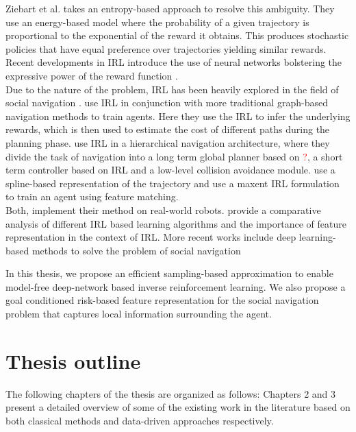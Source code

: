 Ziebart et al. \cite{ziebart_maxent_2008} takes an entropy-based approach to resolve this ambiguity. They use an energy-based model where the probability of a given trajectory is proportional to the exponential of the reward it obtains. This produces stochastic policies that have equal preference over trajectories yielding similar rewards. Recent developments in IRL introduce the use of neural networks bolstering the expressive power of the reward function \cite{wulfmeier2015maximum}. \\

Due to the nature of the problem, IRL has been heavily explored in the field of social navigation \cite{kuderer_socially_nodate, kretzschmar_socially_2016}. \cite{shiarlis_rapidly_2017, okal_efcient_nodate} use IRL in conjunction with more traditional graph-based navigation methods to train agents. Here they use the IRL to infer the underlying rewards, which is then used to estimate the cost of different paths during the planning phase. \cite{kim_socially_2016} use IRL in a hierarchical navigation architecture, where they divide the task of navigation into a long term global planner based on \textcolor{red}{?}, a short term controller based on IRL and a low-level collision avoidance module. \cite{kretzschmar_socially_2016} use a spline-based representation of the trajectory and use a maxent IRL formulation to train an agent using feature matching. 
\\
Both,\cite{kim_socially_2016, kretzschmar_socially_2016} implement their method on real-world robots. \cite{vasquez_inverse_2014} provide a comparative analysis of different IRL based learning algorithms and the importance of feature representation in the context of IRL. More recent works include deep learning-based methods to solve the problem of social navigation \cite{fahad_learning_2018, wulfmeier2015maximum}


In this thesis, we propose an efficient sampling-based approximation to enable model-free deep-network based inverse reinforcement learning. We also propose a goal conditioned risk-based feature representation for the social navigation problem that captures local information surrounding the agent. 

\section{Thesis outline}
The following chapters of the thesis are organized as follows:
Chapters 2 and 3 present a detailed overview of some of the existing work in the literature based on both classical methods and data-driven approaches respectively.

